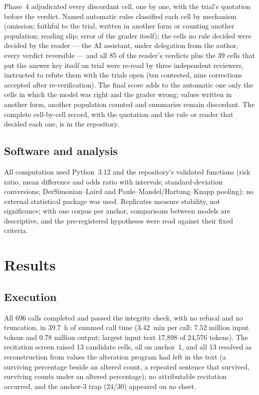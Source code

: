 \documentclass[11pt]{article}
\begin{document}
Phase~4 adjudicated every discordant cell, one by one, with the trial's quotation before the verdict. Named automatic rules classified each cell by mechanism (omission; faithful to the trial, written in another form or counting another population; reading slip; error of the grader itself); the cells no rule decided were decided by the reader --- the AI assistant, under delegation from the author, every verdict reversible --- and all 85 of the reader's verdicts plus the 39 cells that put the answer key itself on trial were re-read by three independent reviewers, instructed to refute them with the trials open (ten contested, nine corrections accepted after re-verification). The final score adds to the automatic one only the cells in which the model was right and the grader wrong; values written in another form, another population counted and summaries remain discordant. The complete cell-by-cell record, with the quotation and the rule or reader that decided each one, is in the repository.

\subsection{Software and analysis}
All computation used Python~3.12 and the repository's validated functions (risk ratio, mean difference and odds ratio with intervals; standard-deviation conversions; DerSimonian--Laird and Paule--Mandel/Hartung--Knapp pooling); no external statistical package was used. Replicates measure stability, not significance; with one corpus per anchor, comparisons between models are descriptive, and the pre-registered hypotheses were read against their fixed criteria.

\section{Results}

\subsection{Execution}
All 696 calls completed and passed the integrity check, with no refusal and no truncation, in 39.7~h of summed call time (3.42~min per call; 7.52 million input tokens and 0.78 million output; largest input text 17,898 of 24,576 tokens). The recitation screen raised 13 candidate cells, all on anchor~1, and all 13 resolved as reconstruction from values the alteration program had left in the text (a surviving percentage beside an altered count, a repeated sentence that survived, surviving counts under an altered percentage); no attributable recitation occurred, and the anchor-3 trap (24/30) appeared on no sheet.
\end{document}
